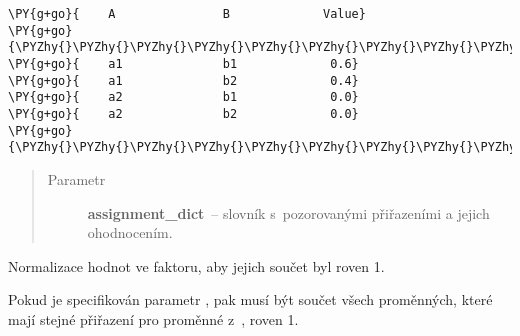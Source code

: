 \begin{fulllineitems}
\begin{fulllineitems}
\begin{Verbatim}[commandchars=\\\{\}]
\PY{g+go}{    A               B             Value}
\PY{g+go}{\PYZhy{}\PYZhy{}\PYZhy{}\PYZhy{}\PYZhy{}\PYZhy{}\PYZhy{}\PYZhy{}\PYZhy{}\PYZhy{}\PYZhy{}\PYZhy{}\PYZhy{}\PYZhy{}\PYZhy{}\PYZhy{}\PYZhy{}\PYZhy{}\PYZhy{}\PYZhy{}\PYZhy{}\PYZhy{}\PYZhy{}\PYZhy{}\PYZhy{}\PYZhy{}\PYZhy{}\PYZhy{}\PYZhy{}\PYZhy{}\PYZhy{}\PYZhy{}\PYZhy{}\PYZhy{}\PYZhy{}\PYZhy{}\PYZhy{}\PYZhy{}\PYZhy{}\PYZhy{}\PYZhy{}\PYZhy{}\PYZhy{}\PYZhy{}\PYZhy{}\PYZhy{}\PYZhy{}\PYZhy{}\PYZhy{}\PYZhy{}}
\PY{g+go}{    a1              b1             0.6}
\PY{g+go}{    a1              b2             0.4}
\PY{g+go}{    a2              b1             0.0}
\PY{g+go}{    a2              b2             0.0}
\PY{g+go}{\PYZhy{}\PYZhy{}\PYZhy{}\PYZhy{}\PYZhy{}\PYZhy{}\PYZhy{}\PYZhy{}\PYZhy{}\PYZhy{}\PYZhy{}\PYZhy{}\PYZhy{}\PYZhy{}\PYZhy{}\PYZhy{}\PYZhy{}\PYZhy{}\PYZhy{}\PYZhy{}\PYZhy{}\PYZhy{}\PYZhy{}\PYZhy{}\PYZhy{}\PYZhy{}\PYZhy{}\PYZhy{}\PYZhy{}\PYZhy{}\PYZhy{}\PYZhy{}\PYZhy{}\PYZhy{}\PYZhy{}\PYZhy{}\PYZhy{}\PYZhy{}\PYZhy{}\PYZhy{}\PYZhy{}\PYZhy{}\PYZhy{}\PYZhy{}\PYZhy{}\PYZhy{}\PYZhy{}\PYZhy{}\PYZhy{}\PYZhy{}}
\end{Verbatim}
\begin{quote}\begin{description}
\item[{Parametr}] \leavevmode
\textbf{assignment\_dict}~-- slovník s~pozorovanými přiřazeními a jejich ohodnocením.

\end{description}\end{quote}

\end{fulllineitems}


\begin{fulllineitems}
\label{alex.infer:alex.infer.factor.Factor.normalize}
Normalizace hodnot ve faktoru, aby jejich součet byl roven 1.

Pokud je specifikován parametr , pak musí být součet všech
proměnných, které mají stejné přiřazení pro proměnné z~, roven
1.


\end{fulllineitems}
\end{fulllineitems}
